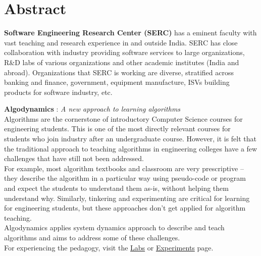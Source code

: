 \cleardoublepage
\sectionfont{\fontsize{18}{15}\selectfont}
\section*{Abstract}
\begin{FlushLeft}
\textbf{Software Engineering Research Center (SERC)} has a eminent faculty with vast teaching and research experience in and outside India. SERC has close collaboration with industry providing software services to large organizations, R\&D labs of various organizations and other academic institutes (India and abroad). Organizations that SERC is working are diverse, stratified across banking and finance, government, equipment manufacture, ISVs building products for software industry, etc.\\[0.5in]
\end{FlushLeft} 

\begin{FlushLeft}
\textbf{Algodynamics} : \emph{A new approach to learning algorithms}\\[0.1in]
Algorithms are the cornerstone of introductory Computer Science courses for engineering students. This is one of the most directly relevant courses for students who join industry after an undergraduate course. However, it is felt that the traditional approach to teaching algorithms in engineering colleges have a few challenges that have still not been addressed.\\[0.1in] For example, most algorithm textbooks and classroom are very prescriptive – they describe the algorithm in a particular way using pseudo-code or program and expect the students to understand them as-is, without helping them understand why. Similarly, tinkering and experimenting are critical for learning for engineering students, but these approaches don’t get applied for algorithm teaching.\\[0.1in]

Algodynamics applies system dynamics approach to describe and teach algorithms and aims to address some of these challenges.\\[0.1in]

For experiencing the pedagogy, visit the \href{https://algodynamics.io/labs.html}{Labs} or \href{https://algodynamics.io/experiments.html}{Experiments} page.\\[0.1in]
\end{FlushLeft}